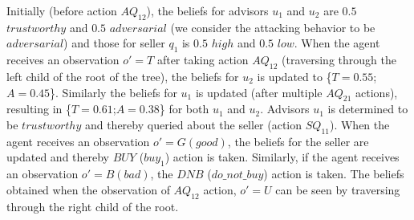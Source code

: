 \documentclass{aamas2014}
\begin{document}
Initially (before action $AQ_{12}$), the beliefs for advisors $u_1$ and $u_2$ are $0.5$ $trustworthy$ and $0.5$ $adversarial$ (we consider the attacking behavior to be $adversarial$) and those for seller $q_1$ is $0.5$ $high$ and $0.5$ $low$. When the agent receives an observation $o'=T$ after taking action $AQ_{12}$  (traversing through the left child of the root of the tree), the beliefs for $u_2$ is updated to \{$T=0.55$;$A=0.45$\}. Similarly the beliefs for $u_1$ is updated (after multiple $AQ_{21}$ actions), resulting in \{$T=0.61$;$A=0.38$\} for both $u_1$ and $u_2$. Advisors $u_1$ is determined to be $trustworthy$ and thereby queried about the seller (action $SQ_{11}$). When the agent receives an observation $o'=G (good)$, the beliefs for the seller are updated and thereby $BUY$ ($buy_1$) action is taken. Similarly, if the agent receives an observation $o'=B (bad)$, the $DNB$ ($do\_not\_buy$) action is taken. The beliefs obtained when the observation of $AQ_{12}$ action, $o'=U$ can be seen by traversing through the right child of the root.
\end{document}
